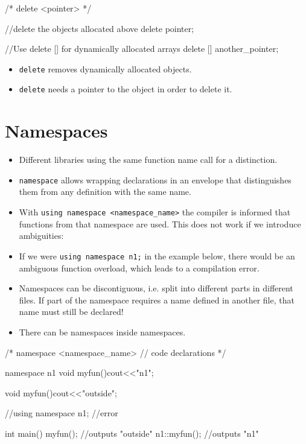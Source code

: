 \documentclass[10pt,a4paper]{scrartcl}
\begin{document}
\begin{multicols*}{2}
\begin{TPCpp}
/*
	delete <pointer>
*/

//delete the objects allocated above
delete pointer;

//Use delete [] for dynamically allocated arrays
delete [] another_pointer;
\end{TPCpp}

\begin{itemize}
\item \verb+delete+ removes dynamically allocated objects.
\item \verb+delete+ needs a pointer to the object in order to delete it.
\end{itemize}

\section{Namespaces}
\label{sec:Namespaces}

\begin{itemize}
\item Different libraries using the same function name call for a distinction.
\item \verb+namespace+ allows wrapping declarations in an envelope that distinguishes them from any definition with the same name.
\item With \verb+using namespace <namespace_name>+ the compiler is informed that functions from that namespace are used. This does not work if we introduce ambiguities:
\item If we were \verb+using namespace n1;+ in the example below, there would be an ambiguous function overload, which leads to a compilation error.
\item Namespaces can be discontiguous, i.e. split into different parts in different files. If part of the namespace requires a name defined in another file, that name must still be declared!
\item There can be namespaces inside namespaces.
\end{itemize}

\begin{TPCpp}
/*	
namespace <namespace_name> {
	// code declarations
}
*/

namespace n1 {
	void myfun(){cout<<"n1";}
}

void myfun(){cout<<"outside";}

//using namespace n1; //error

int main(){
	myfun(); //outputs "outside"
	n1::myfun(); //outputs "n1"
}
\end{TPCpp}


\end{multicols*}
\end{document}
